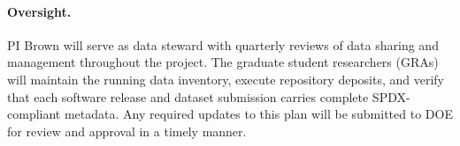 \paragraph{Oversight.}
PI Brown will serve as data steward with quarterly reviews of data sharing and management throughout the project. The graduate student researchers (GRAs) will maintain the running data inventory, execute repository deposits, and verify that each software release and dataset submission carries complete SPDX-compliant metadata. Any required updates to this plan will be submitted to DOE for review and approval in a timely manner.